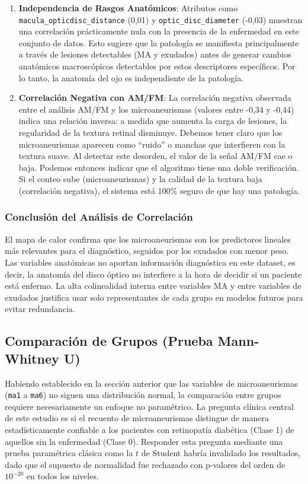 \begin{enumerate}
    \item \textbf{Independencia de Rasgos Anatómicos}: Atributos como \texttt{macula\_opticdisc\_distance} (0,01) y \texttt{optic\_disc\_diameter} (-0,03) muestran una correlación prácticamente nula con la presencia de la enfermedad en este conjunto de datos. Esto sugiere que la patología se manifiesta principalmente a través de lesiones detectables (MA y exudados) antes de generar cambios anatómicos macroscópicos detectables por estos descriptores específicos. Por lo tanto, la anatomía del ojo es independiente de la patología.
    \item \textbf{Correlación Negativa con AM/FM}: La correlación negativa observada entre el análisis AM/FM y los microaneurismas (valores entre -0,34 y -0,44) indica una relación inversa: a medida que aumenta la carga de lesiones, la regularidad de la textura retinal disminuye. Debemos tener claro que los microaneurismas aparecen como \enquote{ruido} o manchas que interfieren con la textura suave. Al detectar este desorden, el valor de la señal AM/FM cae o baja. Podemos entonces indicar que el algoritmo tiene una doble verificación. Si el conteo sube (microaneurismas) y la calidad de la textura baja (correlación negativa), el sistema está 100\% seguro de que hay una patología.

\end{enumerate}

\subsubsection{Conclusión del Análisis de Correlación}

El mapa de calor confirma que los microaneurismas son los predictores lineales más relevantes para el diagnóstico, seguidos por los exudados con menor peso. Las variables anatómicas no aportan información diagnóstica en este dataset, es decir, la anatomía del disco óptico no interfiere a la hora de decidir si un paciente está enfermo. La alta colinealidad interna entre variables MA y entre variables de exudados justifica usar solo representantes de cada grupo en modelos futuros para evitar redundancia.

\subsection{Comparación de Grupos (Prueba Mann-Whitney U)}

Habiendo establecido en la sección anterior que las variables de microaneurismas
(\texttt{ma1} a \texttt{ma6}) no siguen una distribución normal, la comparación entre
grupos requiere necesariamente un enfoque no paramétrico. La pregunta clínica central
de este estudio es si el recuento de microaneurismas distingue de manera estadísticamente
confiable a los pacientes con retinopatía diabética (Clase 1) de aquellos sin la
enfermedad (Clase 0). Responder esta pregunta mediante una prueba paramétrica clásica
como la $t$ de Student habría invalidado los resultados, dado que el supuesto de
normalidad fue rechazado con p-valores del orden de $10^{-20}$ en todos los niveles.

